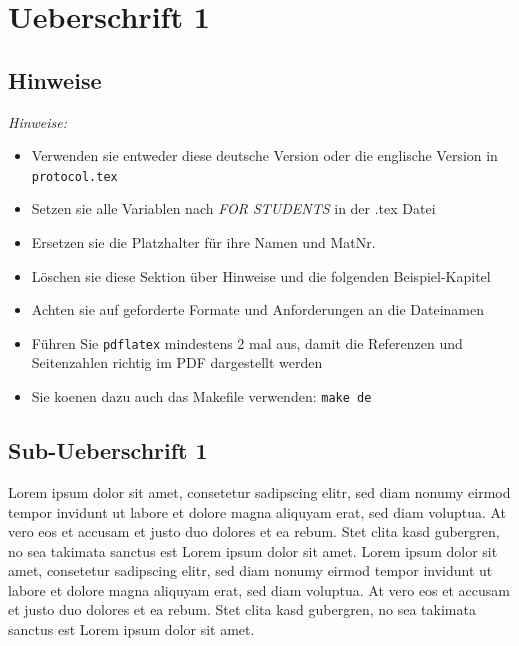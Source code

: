 \documentclass[12pt,a4paper,titlepage,oneside]{scrartcl}
\begin{document}
\maketitle
\setcounter{section}{0}
\setcounter{tocdepth}{2}
\tableofcontents

%
%

\section{Ueberschrift 1}

\subsection{Hinweise}
\emph{Hinweise:}
\begin{itemize}
    \item Verwenden sie entweder diese deutsche Version oder die englische Version in \lstinline{protocol.tex}
    \item Setzen sie alle Variablen nach \emph{FOR STUDENTS} in der .tex Datei
    \item Ersetzen sie die Platzhalter für ihre Namen und MatNr.
    \item Löschen sie diese Sektion über Hinweise und die folgenden Beispiel-Kapitel
    \item Achten sie auf geforderte Formate und Anforderungen an die Dateinamen
    \item Führen Sie \lstinline{pdflatex} mindestens 2 mal aus, damit die Referenzen und Seitenzahlen richtig im PDF dargestellt werden
    \item Sie koenen dazu auch das Makefile verwenden: \lstinline{make de}
\end{itemize}

\subsection{Sub-Ueberschrift 1}
Lorem ipsum dolor sit amet, consetetur sadipscing elitr, sed diam nonumy eirmod tempor invidunt ut labore et dolore magna aliquyam erat, sed diam voluptua. At vero eos et accusam et justo duo dolores et ea rebum. Stet clita kasd gubergren, no sea takimata sanctus est Lorem ipsum dolor sit amet. Lorem ipsum dolor sit amet, consetetur sadipscing elitr, sed diam nonumy eirmod tempor invidunt ut labore et dolore magna aliquyam erat, sed diam voluptua. At vero eos et accusam et justo duo dolores et ea rebum. Stet clita kasd gubergren, no sea takimata sanctus est Lorem ipsum dolor sit amet.
\end{document}
